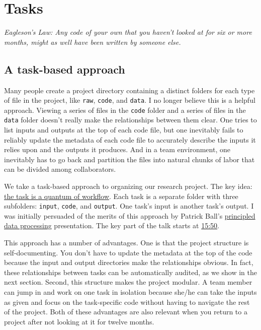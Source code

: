 \section{Tasks}

\noindent \textit{Eagleson's Law: Any code of your own that you haven't looked at for six or more months, might as well have been written by someone else.}

\subsection{A task-based approach}

Many people create a project directory containing a distinct folders for each type of file in the project, like \texttt{raw}, \texttt{code}, and \texttt{data}.
I no longer believe this is a helpful approach.
Viewing a series of files in the \texttt{code} folder and a series of files in the \texttt{data} folder doesn't really make the relationships between them clear.
One tries to list inputs and outputs at the top of each code file,
but one inevitably fails to reliably update the metadata of each code file to accurately describe the inputs it relies upon and the outputs it produces.
And in a team environment, one inevitably has to go back and partition the files into natural chunks of labor that can be divided among collaborators.

We take a task-based approach to organizing our research project.
The key idea: \href{https://hrdag.org/2016/06/14/the-task-is-a-quantum-of-workflow/}{the task is a quantum of workflow}. 
Each task is a separate folder with three subfolders: \texttt{input}, \texttt{code}, and \texttt{output}.
One task's input is another task's output.
I was initially persuaded of the merits of this approach by Patrick Ball's \href{https://www.youtube.com/watch?v=ZSunU9GQdcI}{principled data processing} presentation.
The key part of the talk starts at \href{https://youtu.be/ZSunU9GQdcI?t=15m50s}{15:50}.

This approach has a number of advantages.
One is that the project structure is self-documenting.
You don't have to update the metadata at the top of the code because the input and output directories make the relationships obvious.
In fact, these relationships between tasks can be automatically audited, 
as we show in the next section.
Second, this structure makes the project modular.
A team member can jump in and work on one task in isolation because she/he can take the inputs as given and focus on the task-specific code without having to navigate the rest of the project.
Both of these advantages are also relevant when you return to a project after not looking at it for twelve months.

